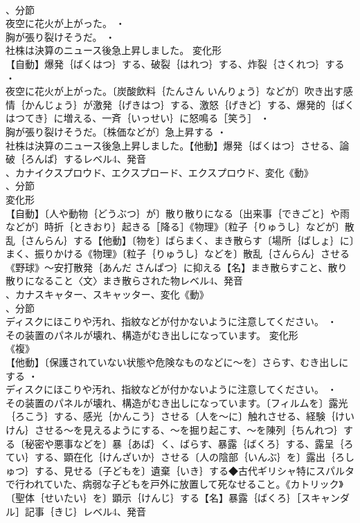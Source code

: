 \documentclass[8pt]{extreport}
\begin{document}
\begin{CJK}{UTF8}{min}
\\	、分節
\\	夜空に花火が上がった。 ・
\\	胸が張り裂けそうだ。 ・
\\	社株は決算のニュース後急上昇しました。	変化形 
\\	【自動】爆発｛ばくはつ｝する、破裂｛はれつ｝する、炸裂｛さくれつ｝する ・
\\	夜空に花火が上がった。〔炭酸飲料｛たんさん いんりょう｝などが〕吹き出す感情｛かんじょう｝が激発｛げきはつ｝する、激怒｛げきど｝する、爆発的｛ばくはつてき｝に増える、一斉｛いっせい｝に怒鳴る［笑う］ ・
\\	胸が張り裂けそうだ。〔株価などが〕急上昇する ・
\\	社株は決算のニュース後急上昇しました。【他動】爆発｛ばくはつ｝させる、論破｛ろんぱ｝するレベル4、発音
\\	、カナイクスプロウド、エクスプロード、エクスプロウド、変化《動》
\\	、分節
\\	変化形 
\\	【自動】〔人や動物｛どうぶつ｝が〕散り散りになる〔出来事｛できごと｝や雨などが〕時折｛ときおり｝起きる［降る］《物理》〔粒子｛りゅうし｝などが〕散乱｛さんらん｝する【他動】〔物を〕ばらまく、まき散らす〔場所｛ばしょ｝に〕まく、振りかける《物理》〔粒子｛りゅうし｝などを〕散乱｛さんらん｝させる《野球》～安打散発｛あんだ さんぱつ｝に抑える【名】まき散らすこと、散り散りになること〈文〉まき散らされた物レベル4、発音
\\	、カナスキャター、スキャッター、変化《動》
\\	、分節
\\	ディスクにほこりや汚れ、指紋などが付かないように注意してください。 ・
\\	その装置のパネルが壊れ、構造がむき出しになっています。	変化形 
\\	《複》
\\	【他動】〔保護されていない状態や危険なものなどに～を〕さらす、むき出しにする ・
\\	ディスクにほこりや汚れ、指紋などが付かないように注意してください。 ・
\\	その装置のパネルが壊れ、構造がむき出しになっています。〔フィルムを〕露光｛ろこう｝する、感光｛かんこう｝させる〔人を～に〕触れさせる、経験｛けいけん｝させる～を見えるようにする、～を掘り起こす、～を陳列｛ちんれつ｝する〔秘密や悪事などを〕暴｛あば｝く、ばらす、暴露｛ばくろ｝する、露呈｛ろてい｝する、顕在化｛けんざいか｝させる〔人の陰部｛いんぶ｝を〕露出｛ろしゅつ｝する、見せる〔子どもを〕遺棄｛いき｝する◆古代ギリシャ特にスパルタで行われていた、病弱な子どもを戸外に放置して死なせること。《カトリック》〔聖体｛せいたい｝を〕顕示｛けんじ｝する【名】暴露｛ばくろ｝［スキャンダル］記事｛きじ｝レベル4、発音

\end{CJK}
\end{document}
